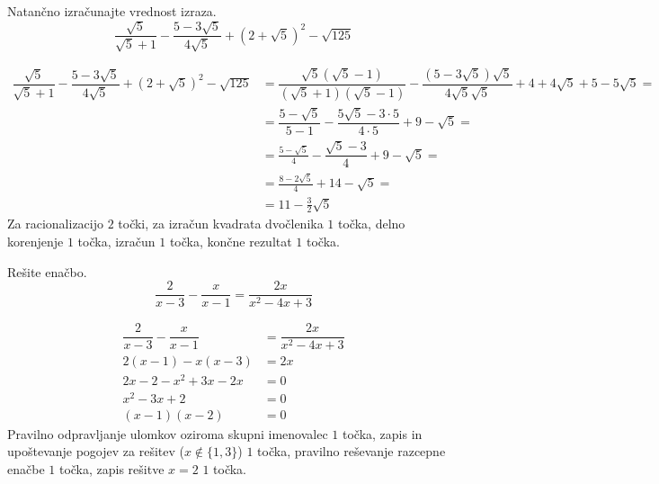 \documentclass[addpoints]{exam}
\begin{document}
\begin{questions}


    \question[6]
    Natančno izračunajte vrednost izraza.
    $$ \dfrac{\sqrt{5}}{\sqrt{5}+1}-\dfrac{5-3\sqrt{5}}{4\sqrt{5}}+\left(2+\sqrt{5}\right)^2-\sqrt{125} $$

    \begin{solution}[7cm]
        \begin{align*} 
            \dfrac{\sqrt{5}}{\sqrt{5}+1}-\dfrac{5-3\sqrt{5}}{4\sqrt{5}}+\left(2+\sqrt{5}\right)^2-\sqrt{125}&=\dfrac{\sqrt{5}(\sqrt{5}-1)}{(\sqrt{5}+1)(\sqrt{5}-1)}-\dfrac{(5-3\sqrt{5})\sqrt{5}}{4\sqrt{5}\sqrt{5}}+4+4\sqrt{5}+5-5\sqrt{5}= \\
                                                                                                            &=\dfrac{5-\sqrt{5}}{5-1}-\dfrac{5\sqrt{5}-3\cdot 5}{4\cdot 5}+9-\sqrt{5}= \\
                                                                                                            &=\frac{5-\sqrt{5}}{4}-\dfrac{\sqrt{5}-3}{4}+9-\sqrt{5}= \\
                                                                                                            &=\frac{8-2\sqrt{5}}{4}+14-\sqrt{5}= \\
                                                                                                            &=11-\frac{3}{2}\sqrt{5}
        \end{align*}
        Za racionalizacijo $2$ točki, za izračun kvadrata dvočlenika $1$ točka, delno korenjenje $1$ točka, izračun $1$ točka, končne rezultat $1$ točka.
    \end{solution}
    
    

    \question[4]
    Rešite enačbo.
    $$ \dfrac{2}{x-3}-\dfrac{x}{x-1}=\dfrac{2x}{x^2-4x+3} $$
    
    
    \begin{solution}[4cm]
        \begin{align*} 
            \dfrac{2}{x-3}-\dfrac{x}{x-1} &=\dfrac{2x}{x^2-4x+3} \\
            2(x-1)-x(x-3) &= 2x \\
            2x-2-x^2+3x-2x &=0 \\
            x^2-3x+2 &=0 \\
            (x-1)(x-2) &=0
        \end{align*}
        Pravilno odpravljanje ulomkov oziroma skupni imenovalec $1$ točka, zapis in upoštevanje pogojev za rešitev ($x\notin\{1,3\}$) $1$ točka, pravilno reševanje razcepne enačbe $1$ točka, zapis rešitve $x=2$ $1$ točka.
    \end{solution}


\end{questions}
\end{document}
